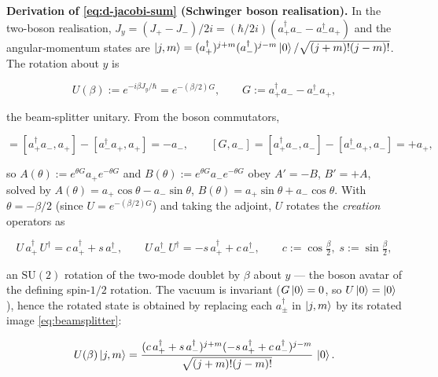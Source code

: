 \medskip\noindent\textbf{Derivation of \eqref{eq:d-jacobi-sum} (Schwinger boson realisation).} In the two-boson realisation, $J_{y}=(J_{+}-J_{-})/2i=(\hbar/2i)(a_{+}^{\dagger}a_{-}-a_{-}^{\dagger}a_{+})$ and the angular-momentum states are $\ket{j,m}=(a_{+}^{\dagger})^{j+m}(a_{-}^{\dagger})^{j-m}\ket{0}/\sqrt{(j+m)!(j-m)!}$. The rotation about $y$ is
\begin{linenomath}
\begin{equation}
U(\beta):=e^{-i\beta J_{y}/\hbar}=e^{-(\beta/2)G},\qquad G:=a_{+}^{\dagger}a_{-}-a_{-}^{\dagger}a_{+},
\label{eq:schwinger-U}
\end{equation}
\end{linenomath}
the beam-splitter unitary. From the boson commutators,
\begin{linenomath}
\begin{equation*}
[G,a_{+}]=[a_{+}^{\dagger}a_{-},a_{+}]-[a_{-}^{\dagger}a_{+},a_{+}]=-a_{-},\qquad
[G,a_{-}]=[a_{+}^{\dagger}a_{-},a_{-}]-[a_{-}^{\dagger}a_{+},a_{-}]=+a_{+},
\end{equation*}
\end{linenomath}
so $A(\theta):=e^{\theta G}a_{+}e^{-\theta G}$ and $B(\theta):=e^{\theta G}a_{-}e^{-\theta G}$ obey $A'=-B$, $B'=+A$, solved by $A(\theta)=a_{+}\cos\theta-a_{-}\sin\theta$, $B(\theta)=a_{+}\sin\theta+a_{-}\cos\theta$. With $\theta=-\beta/2$ (since $U=e^{-(\beta/2)G}$) and taking the adjoint, $U$ rotates the \emph{creation} operators as
\begin{linenomath}
\begin{equation}
U\,a_{+}^{\dagger}\,U^{\dagger}=c\,a_{+}^{\dagger}+s\,a_{-}^{\dagger},\qquad
U\,a_{-}^{\dagger}\,U^{\dagger}=-s\,a_{+}^{\dagger}+c\,a_{-}^{\dagger},
\qquad c:=\cos\tfrac{\beta}{2},\;s:=\sin\tfrac{\beta}{2},
\label{eq:beamsplitter}
\end{equation}
\end{linenomath}
an $\mathrm{SU}(2)$ rotation of the two-mode doublet by $\beta$ about $y$ --- the boson avatar of the defining spin-$1/2$ rotation. The vacuum is invariant ($G\ket{0}=0$, so $U\ket{0}=\ket{0}$), hence the rotated state is obtained by replacing each $a_{\pm}^{\dagger}$ in $\ket{j,m}$ by its rotated image \eqref{eq:beamsplitter}:
\begin{linenomath}
\begin{equation}
U(\beta)\ket{j,m}=\frac{(c\,a_{+}^{\dagger}+s\,a_{-}^{\dagger})^{j+m}(-s\,a_{+}^{\dagger}+c\,a_{-}^{\dagger})^{j-m}}{\sqrt{(j+m)!(j-m)!}}\,\ket{0}.
\label{eq:schwinger-rotated-state}
\end{equation}
\end{linenomath}
